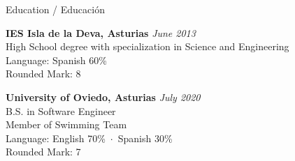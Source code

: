 \documentclass{resume} %
\begin{document}



\pagestyle{fancy}

\def\headrulewidth{0pt}
\setlength{\ruleheight}{\textheight}
\addtolength{\ruleheight}{20mm}
\fancyhead{}
\fancyfoot{}
\fancyfoot[C]{\footnotesize\thepage}





\begin{rSection}{Education / Educación}

{\bf IES Isla de la Deva, Asturias} \hfill {\em June 2013} \\ 
High School degree with specialization in Science and Engineering \\
Language: Spanish 60\% \\
Rounded Mark: 8

{\bf University of Oviedo, Asturias} \hfill {\em July 2020} \\ 
B.S. in Software Engineer \\
Member of Swimming Team \\
Language: English 70\%~$\cdot$~Spanish 30\% \\
Rounded Mark: 7

\end{rSection}

\end{document}
